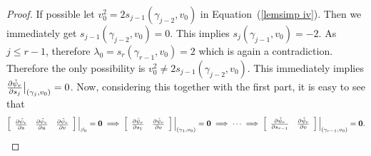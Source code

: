 \documentclass[10pt,a4paper]{amsart}
\begin{document}
\begin{proof}
If possible let $v_0^2=2s_{j-1}(\gamma_{j-2},v_0)$ in Equation~(\ref{lemsimp iv}). Then we immediately get $s_{j-1}(\gamma_{j-2},v_0)=0$. This implies $s_j(\gamma_{j-1},v_0)=-2$. As $j\leq r-1$, therefore $\lambda_0=s_r(\gamma_{r-1},v_0)=2$ which is again a contradiction. Therefore the only possibility is $v_0^2\neq 2s_{j-1}(\gamma_{j-2},v_0)$. This immediately implies $\frac{\partial\Tilde{\psi}_r}{\partial s_{j}}\big |_{(\gamma_j,v_0)}=0$. Now, considering this together with the first part, it is easy to see that 
\begin{eqnarray*}
\left[\begin{array}{ccc}
\frac{\partial\Tilde{\psi}_r}{\partial s} & \frac{\partial\Tilde{\psi}_r}{\partial u} & \frac{\partial\Tilde{\psi}_r}{\partial v}  \end{array}\right]\Big |_{\beta_0}=\mathbf{0}\implies \left[\begin{array}{ccc}\frac{\partial\Tilde{\psi}_r}{\partial s_1} & \frac{\partial\Tilde{\psi}_r}{\partial v}  \end{array}\right]\Big |_{(\gamma_1,v_0)}=\mathbf{0} \implies\cdots\implies \left[\begin{array}{ccc}
\frac{\partial\Tilde{\psi}_r}{\partial s_{r-1}} & \frac{\partial\Tilde{\psi}_r}{\partial v}  \end{array}\right]\Big |_{(\gamma_{r-1},v_0)}=\mathbf{0}.
\end{eqnarray*}


\end{proof}
\end{document}
